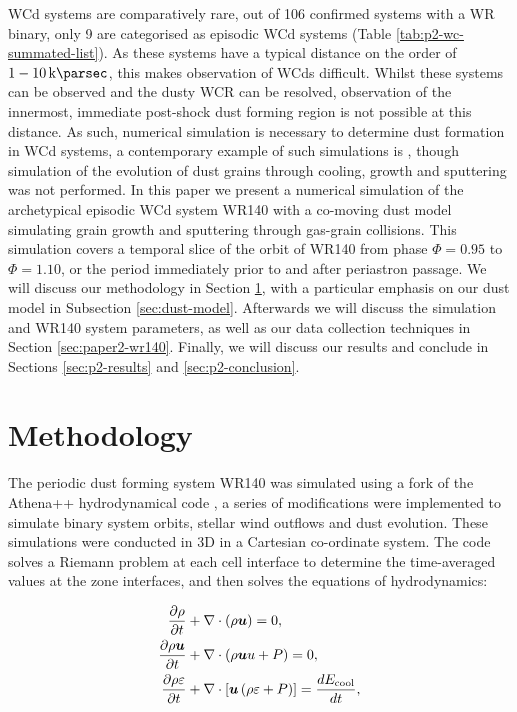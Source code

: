 WCd systems are comparatively rare, out of 106 confirmed systems with a WR binary, only 9 are categorised as episodic WCd systems
(Table \ref{tab:p2-wc-summated-list}).
As these systems have a typical distance on the order of $1-10 \, \si{\kilo\parsec}$, this makes observation of WCds difficult.
Whilst these systems can be observed and the dusty WCR can be resolved, observation of the innermost, immediate post-shock dust forming region is not possible at this distance.
As such, numerical simulation is necessary to determine dust formation in WCd systems, a contemporary example of such simulations is \textcite{hendrix_pinwheels_2016}, though simulation of the evolution of dust grains through cooling, growth and sputtering was not performed.
In this paper we present a numerical simulation of the archetypical episodic WCd system WR140 with a co-moving dust model simulating grain growth and sputtering through gas-grain collisions.
This simulation covers a temporal slice of the orbit of WR140 from phase $\Phi = 0.95$ to $\Phi = 1.10$, or the period immediately prior to and after periastron passage.
We will discuss our methodology in Section \ref{sec:paper-2-methodology}, with a particular emphasis on our dust model in Subsection \ref{sec:dust-model}.
Afterwards we will discuss the simulation and WR140 system parameters, as well as our data collection techniques in Section \ref{sec:paper2-wr140}.
Finally, we will discuss our results and conclude in Sections \ref{sec:p2-results} and \ref{sec:p2-conclusion}.


\section{Methodology}
\label{sec:paper-2-methodology}

The periodic dust forming system WR140 was simulated using a fork of the Athena++ hydrodynamical code \parencite{stoneAthenaAdaptiveMesh2020}, a series of modifications were implemented to simulate binary system orbits, stellar wind outflows and dust evolution.
These simulations were conducted in 3D in a Cartesian co-ordinate system.
The code solves a Riemann problem at each cell interface to determine the time-averaged values at the zone interfaces, and then solves the equations of hydrodynamics:

\begin{subequations}
  \begin{align}
    \frac{\partial\rho}{\partial t} & +\nabla \cdot \left(\rho \boldsymbol{u}\right) = 0 , \\
    \frac{\partial \rho \boldsymbol{u}}{\partial t} & + \nabla \cdot \left(\rho \boldsymbol{u} u + P \right) = 0, \\
    \frac{\partial \rho \varepsilon}{\partial t} & + \nabla \cdot \left[ \boldsymbol{u} \left( \rho\varepsilon + P \right) \right] = \frac{dE_\text{cool}}{dt} , 
  \end{align}
\end{subequations}

